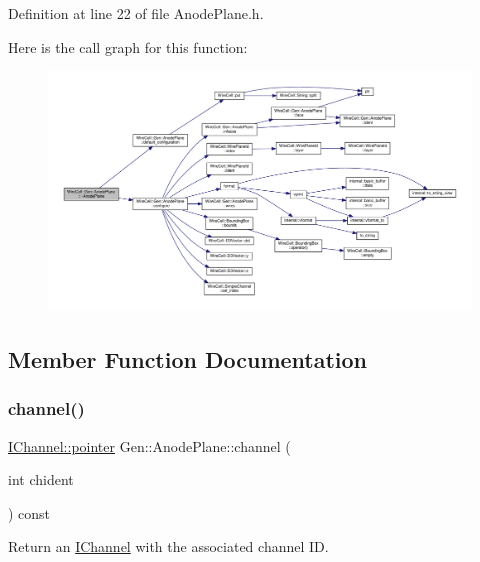 Definition at line 22 of file Anode\+Plane.\+h.

Here is the call graph for this function\+:
\nopagebreak
\begin{figure}[H]
\begin{center}
\leavevmode
\includegraphics[width=350pt]{class_wire_cell_1_1_gen_1_1_anode_plane_a41df48506ad084531fa7ac376f454894_cgraph}
\end{center}
\end{figure}


\subsection{Member Function Documentation}
\mbox{\label{class_wire_cell_1_1_gen_1_1_anode_plane_ae5d1df06d19a616c9d0c46a0b74f7c81}} 
\subsubsection{\texorpdfstring{channel()}{channel()}}
{\footnotesize\ttfamily \hyperlink{class_wire_cell_1_1_i_data_aff870b3ae8333cf9265941eef62498bc}{I\+Channel\+::pointer} Gen\+::\+Anode\+Plane\+::channel (\begin{DoxyParamCaption}\item[{int}]{chident }\end{DoxyParamCaption}) const\hspace{0.3cm}{\ttfamily [virtual]}}



Return an \hyperlink{class_wire_cell_1_1_i_channel}{I\+Channel} with the associated channel ID. 



